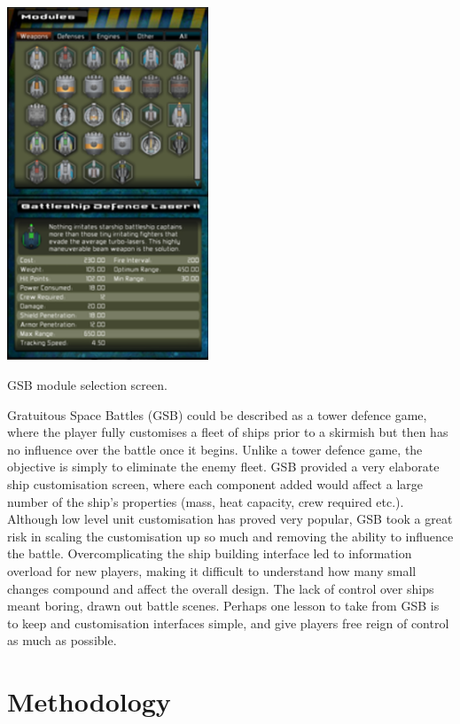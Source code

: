 \begin{marginfigure}
	\includegraphics[width=6cm]{res/gsb/modules}
	\caption{GSB module selection screen.}
\end{marginfigure}

Gratuitous Space Battles (GSB) could be described as a tower defence game, where the player fully customises a fleet of ships prior to a skirmish but then has no influence over the battle once it begins. Unlike a tower defence game, the objective is simply to eliminate the enemy fleet. GSB provided a very elaborate ship customisation screen, where each component added would affect a large number of the ship's properties (mass, heat capacity, crew required etc.). Although low level unit customisation has proved very popular, GSB took a great risk in scaling the customisation up so much and removing the ability to influence the battle. Overcomplicating the ship building interface led to information overload for new players, making it difficult to understand how many small changes compound and affect the overall design. The lack of control over ships meant boring, drawn out battle scenes. Perhaps one lesson to take from GSB is to keep and customisation interfaces simple, and give players free reign of control as much as possible.





\section{Methodology}

